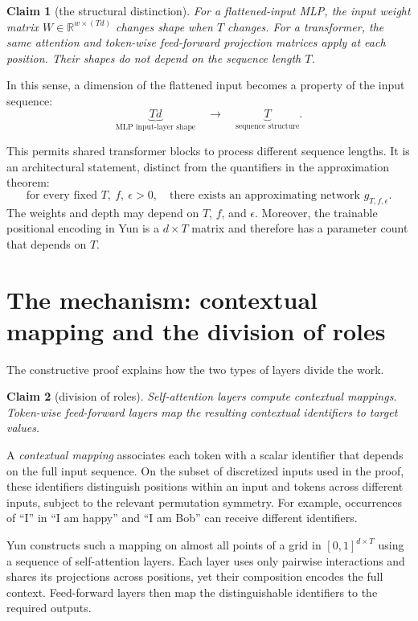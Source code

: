 \documentclass[11pt]{article}
\newtheorem*{claim}{Claim}
\begin{document}
\begin{claim}[the structural distinction]
For a flattened-input MLP, the input weight matrix
$W\in\mathbb R^{w\times(Td)}$ changes shape when $T$ changes.
For a transformer, the same attention and token-wise feed-forward
projection matrices apply at each position. Their shapes do not depend
on the sequence length $T$.
\end{claim}

In this sense, a dimension of the flattened input becomes a property
of the input sequence:
\begin{equation}
\underbrace{Td}_{\text{MLP input-layer shape}}
\quad\longrightarrow\quad
\underbrace{T}_{\text{sequence structure}}.
\end{equation}

This permits shared transformer blocks to process different sequence
lengths. It is an architectural statement, distinct from the quantifiers
in the approximation theorem:
\[
  \text{for every fixed }T,\ f,\ \epsilon>0,
  \quad\text{there exists an approximating network }g_{T,f,\epsilon}.
\]
The weights and depth may depend on $T$, $f$, and $\epsilon$.
Moreover, the trainable positional encoding in Yun is a
$d\times T$ matrix and therefore has a parameter count that depends on $T$.

\section{The mechanism: contextual mapping and the division of roles}

The constructive proof explains how the two types of layers divide
the work.

\begin{claim}[division of roles]
Self-attention layers compute contextual mappings. Token-wise
feed-forward layers map the resulting contextual identifiers to target values.
\end{claim}

A \emph{contextual mapping} associates each token with a scalar
identifier that depends on the full input sequence. On the subset of
discretized inputs used in the proof, these identifiers distinguish
positions within an input and tokens across different inputs, subject
to the relevant permutation symmetry. For example, occurrences of
``I'' in ``I am happy'' and ``I am Bob'' can receive different identifiers.

Yun constructs such a mapping on almost all points of a grid in
$[0,1]^{d\times T}$ using a sequence of self-attention layers.
Each layer uses only pairwise interactions and shares its projections
across positions, yet their composition encodes the full context.
Feed-forward layers then map the distinguishable identifiers to the
required outputs.
\end{document}
